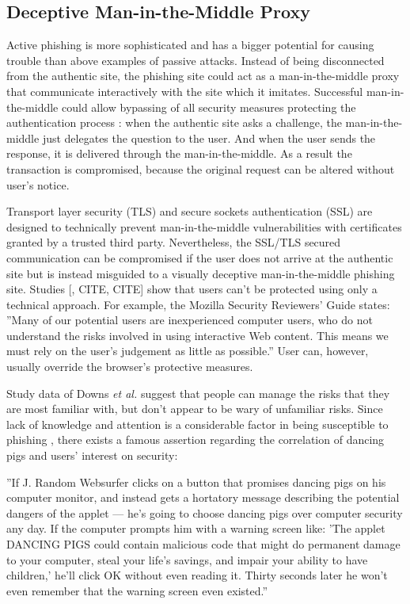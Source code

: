 \documentclass{tktltiki}
\begin{document}
      
\subsection{Deceptive Man-in-the-Middle Proxy}

    Active phishing is more sophisticated and has a bigger potential for causing trouble than above examples of passive attacks. Instead of being disconnected from the authentic site, the phishing site could act as a man-in-the-middle proxy that communicate interactively with the site which it imitates. Successful man-in-the-middle could allow bypassing of all security measures protecting the authentication process \cite{beamauth_2factor_2007, schneier_2factor_2005, why_phishing_works_06}: when the authentic site asks a challenge, the man-in-the-middle just delegates the question to the user. And when the user sends the response, it is delivered through the man-in-the-middle. As a result the transaction is compromised, because the original request can be altered without user's notice.

    Transport layer security (TLS) and secure sockets authentication (SSL) are designed to technically prevent man-in-the-middle vulnerabilities with certificates granted by a trusted third party. Nevertheless, the SSL/TLS secured communication can be compromised if the user does not arrive at the authentic site but is instead misguided to a visually deceptive man-in-the-middle phishing site. Studies \cite{why_phishing_works_06, suspectibility_to_phishing_2006}[, CITE, CITE] show that users can't be protected using only a technical approach. For example, the Mozilla Security Reviewers' Guide \cite{mozilla_security_guide_2010} states: ''Many of our potential users are inexperienced computer users, who do not understand the risks involved in using interactive Web content. This means we must rely on the user's judgement as little as possible.'' User can, however, usually override the browser's protective measures.

    Study data of Downs \emph{et al.} \cite{suspectibility_to_phishing_2006} suggest that people can manage the risks that they are most familiar with, but don't appear to be wary of unfamiliar risks. Since lack of knowledge and attention is a considerable factor in being susceptible to phishing \cite{why_phishing_works_06}, there exists a famous assertion regarding the correlation of dancing pigs and users' interest on security:

    ''If J. Random Websurfer clicks on a button that promises dancing pigs on his computer monitor, and instead gets a hortatory message describing the potential dangers of the applet — he's going to choose dancing pigs over computer security any day. If the computer prompts him with a warning screen like: 'The applet DANCING PIGS could contain malicious code that might do permanent damage to your computer, steal your life's savings, and impair your ability to have children,' he'll click OK without even reading it. Thirty seconds later he won't even remember that the warning screen even existed.''\cite{schneier_secrets_and_lies_2000}
\end{document}
